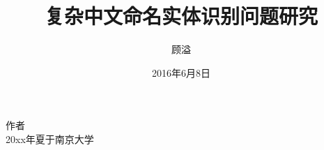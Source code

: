 \documentclass[winfonts,master,oneside,nobackinfo]{njuthesis}
\title{复杂中文命名实体识别问题研究}
\author{顾溢}
\institute{南京大学}
\date{2016年6月8日}
\begin{document}

\maketitle
\makeenglishtitle


\frontmatter

\begin{abstract}
\lipsum[1-2]


\end{abstract}

\begin{englishabstract}
\lipsum[2]


\end{englishabstract}

%
\begin{preface}
\lipsum[1]
\vspace{1cm}
\begin{flushright}
作者\\
20xx年夏于南京大学
\end{flushright}

\end{preface}

\tableofcontents

\listoffigures

\listoftables
\end{document}
